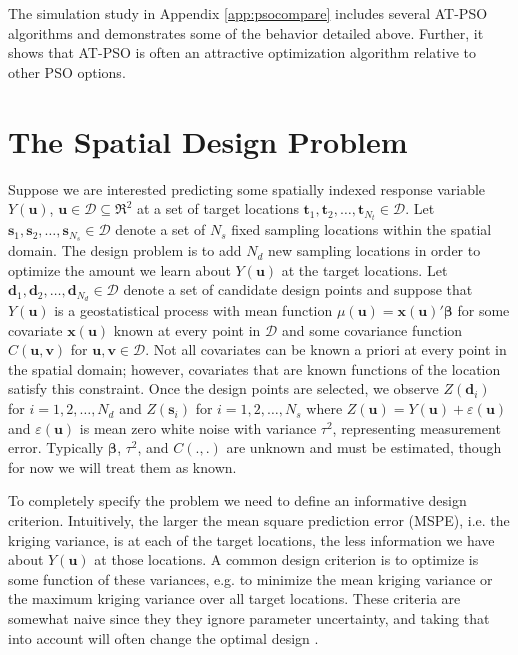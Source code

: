 \documentclass[cmbright]{staauth}
\begin{document}
The simulation study in Appendix \ref{app:psocompare} includes several AT-PSO algorithms and demonstrates some of the behavior detailed above. Further, it shows that AT-PSO is often an attractive optimization algorithm relative to other PSO options.

\section{The Spatial Design Problem}\label{sec:spatialdesign}
Suppose we are interested predicting some spatially indexed response variable $Y(\bm{u})$, $\bm{u}\in \mathcal{D}\subseteq \Re^2$ at a set of target locations $\bm{t}_1, \bm{t}_2, \dots, \bm{t}_{N_t}\in\mathcal{D}$. Let $\bm{s}_1, \bm{s}_2, \dots, \bm{s}_{N_s}\in\mathcal{D}$ denote a set of $N_s$ fixed sampling locations within the spatial domain. The design problem is to add $N_d$ new sampling locations in order to optimize the amount we learn about $Y(\bm{u})$ at the target locations. Let $\bm{d}_1, \bm{d}_2, \dots, \bm{d}_{N_d}\in\mathcal{D}$ denote a set of candidate design points and suppose that $Y(\bm{u})$ is a geostatistical process with mean function $\mu(\bm{u})=\bm{x}(\bm{u})'\bm{\beta}$ for some covariate $\bm{x}(\bm{u})$ known at every point in $\mathcal{D}$ and some covariance function $C(\bm{u}, \bm{v})$ for $\bm{u},\bm{v}\in\mathcal{D}$. Not all covariates can be known a priori at every point in the spatial domain; however, covariates that are known functions of the location satisfy this constraint. Once the design points are selected, we observe $Z(\bm{d}_i)$ for $i=1,2,\dots,N_d$ and $Z(\bm{s}_i)$ for $i=1,2,\dots,N_s$ where $Z(\bm{u}) = Y(\bm{u}) + \varepsilon(\bm{u})$ and $\varepsilon(\bm{u})$ is mean zero white noise with variance $\tau^2$, representing measurement error. Typically $\bm{\beta}$, $\tau^2$, and $C(.,.)$ are unknown and must be estimated, though for now we will treat them as known.

To completely specify the problem we need to define an informative design criterion. Intuitively, the larger the mean square prediction error (MSPE), i.e. the kriging variance, is at each of the target locations, the less information we have about $Y(\bm{u})$ at those locations. A common design criterion is to optimize is some function of these variances, e.g. to minimize the mean kriging variance or the maximum kriging variance over all target locations. These criteria are somewhat naive since they they ignore parameter uncertainty, and taking that into account will often change the optimal design \citep{zimmerman2006optimal}.
\end{document}
